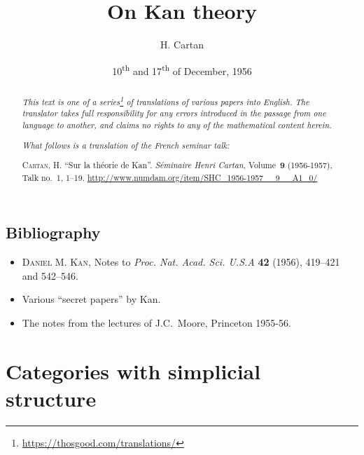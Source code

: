 \documentclass{article}
\title{On Kan theory}
\author{H. Cartan}
\date{10\textsuperscript{th} and 17\textsuperscript{th} of December, 1956}
\theoremstyle{plain}
\theoremstyle{definition}
\newcommand{\oldpage}[1]{\marginpar{\footnotesize$\Big\vert$ \textit{p.~#1}}}
\begin{document}
\maketitle
\thispagestyle{fancy}

\renewcommand{\abstractname}{Translator's note.}

\begin{abstract}
  \renewcommand*{\thefootnote}{\fnsymbol{footnote}}
  \emph{This text is one of a series\footnote{\url{https://thosgood.com/translations/}} of translations of various papers into English.}
  \emph{The translator takes full responsibility for any errors introduced in the passage from one language to another, and claims no rights to any of the mathematical content herein.}

  \medskip
  
  \emph{What follows is a translation of the French seminar talk:}

  \medskip\noindent
  \textsc{Cartan, H.}
  ``Sur la th\'{e}orie de Kan''.
  \emph{S\'{e}minaire Henri Cartan}, Volume~\textbf{9} (1956-1957), Talk no.~1, 1–19.
  {\url{http://www.numdam.org/item/SHC_1956-1957__9__A1_0/}}
\end{abstract}

\setcounter{footnote}{0}

\tableofcontents
\bigskip



\oldpage{1-01}
\subsection*{Bibliography}

\begin{itemize}
  \item \textsc{Daniel M. Kan}, Notes to \emph{Proc. Nat. Acad. Sci. U.S.A} \textbf{42} (1956), 419--421 and 542--546.
  \item Various ``secret papers'' by Kan.
  \item The notes from the lectures of J.C.~Moore, Princeton 1955-56.
\end{itemize}


\section{Categories with simplicial structure}
\label{section1}
\end{document}
